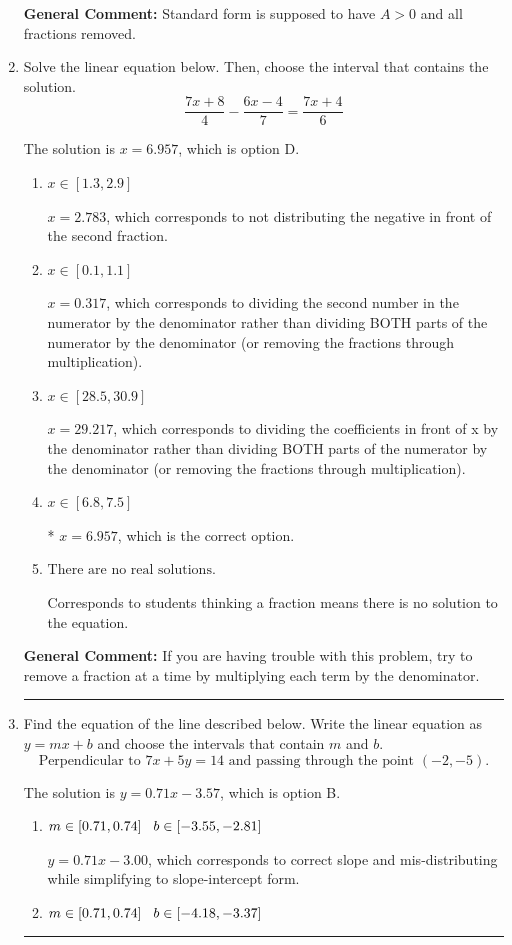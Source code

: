 \documentclass{extbook}[14pt]
\newcommand{\litem}[1]{\item #1

\rule{\textwidth}{0.4pt}}
\begin{document}
\begin{enumerate}
{\textbf{General Comment:} Standard form is supposed to have $A > 0$ and all fractions removed.
}
\litem{
Solve the linear equation below. Then, choose the interval that contains the solution.
\[ \frac{7x + 8}{4} - \frac{6x -4}{7} = \frac{7x + 4}{6} \]

The solution is \( x = 6.957 \), which is option D.\begin{enumerate}[label=\Alph*.]
\item \( x \in [1.3, 2.9] \)

 $x = 2.783$, which corresponds to not distributing the negative in front of the second fraction.
\item \( x \in [0.1, 1.1] \)

 $x = 0.317$, which corresponds to dividing the second number in the numerator by the denominator rather than dividing BOTH parts of the numerator by the denominator (or removing the fractions through multiplication).
\item \( x \in [28.5, 30.9] \)

 $x = 29.217$, which corresponds to dividing the coefficients in front of x by the denominator rather than dividing BOTH parts of the numerator by the denominator (or removing the fractions through multiplication).
\item \( x \in [6.8, 7.5] \)

* $x = 6.957$, which is the correct option.
\item \( \text{There are no real solutions.} \)

Corresponds to students thinking a fraction means there is no solution to the equation.
\end{enumerate}

\textbf{General Comment:} If you are having trouble with this problem, try to remove a fraction at a time by multiplying each term by the denominator.
}
\litem{
Find the equation of the line described below. Write the linear equation as $ y=mx+b $ and choose the intervals that contain $m$ and $b$.
\[ \text{Perpendicular to } 7 x + 5 y = 14 \text{ and passing through the point } (-2, -5). \]

The solution is \( y = 0.71x - 3.57 \), which is option B.\begin{enumerate}[label=\Alph*.]
\item \( m \in [0.71, 0.74] \hspace*{3mm} b \in [-3.55, -2.81] \)

 $y = 0.71x - 3.00$, which corresponds to correct slope and mis-distributing while simplifying to slope-intercept form.
\item \( m \in [0.71, 0.74] \hspace*{3mm} b \in [-4.18, -3.37] \)


\end{enumerate}}
\end{enumerate}
\end{document}
